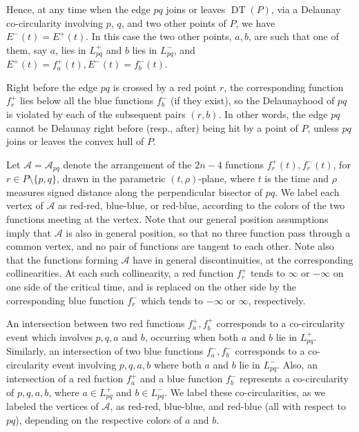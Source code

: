 \documentclass[letter,11pt]{article}
\def\A{\mathcal{A}}
\def \L{{L}}
\def\DT{\mathop{\mathrm{DT}}}
\begin{document}
Hence, at any time when the edge $pq$ joins or leaves $\DT(P)$, via a Delaunay co-circularity involving $p$, $q$, and two other points of $P$, we have $E^-(t)=E^+(t)$. In this case the two other points, $a,b$, are such that one of them, say $a$, lies in $\L_{pq}^+$ and $b$ lies in $\L_{pq}^-$, and $E^+(t)=f_a^+(t), E^-(t)=f_b^-(t)$.


\smallskip
{} 
Right before the edge $pq$ is crossed by a red point $r$, the corresponding function $f_r^+$ lies below all the blue functions $f_b^-$ (if they exist), so the Delaunayhood of $pq$ is violated by each of the subsequent pairs $(r,b)$. 
In other words, the edge $pq$ cannot be Delaunay right before (resp., after) being hit by a point of $P$, unless $pq$ joins or leaves the convex hull of $P$. 

\smallskip

Let $\A=\A_{pq}$ denote the arrangement of the $2n-4$ functions $f_r^+(t),f_r^-(t)$, for $r\in P\setminus\{p,q\}$, drawn in the parametric $(t,\rho)$-plane, where $t$ is the time and $\rho$ measures signed distance along the perpendicular bisector of $pq$. We label each vertex of $\A$ as red-red, blue-blue, or red-blue, according to the colors of the two functions meeting at the vertex. Note that our general position assumptions imply that $\A$ is also in general position, so that no three function pass through a common vertex, and no pair of functions are tangent to each other. Note also that the functions forming $\A$ have in general discontinuities, at the corresponding collinearities. At each such collinearity, a red function $f_r^+$ tends to $\infty$ or $-\infty$ on one side of the critical time, and is replaced on the other side by the corresponding blue function $f_r^-$ which tends to $-\infty$ or $\infty$, respectively.

An intersection between two red functions $f_a^+,f_b^+$ corresponds to a co-circularity event which involves $p,q,a$ and $b$, occurring when both $a$ and $b$ lie in $\L_{pq}^+$.
Similarly, an intersection of two blue functions $f_a^-,f_b^-$ corresponds to a co-circularity event
involving $p,q,a,b$ where both $a$ and $b$ lie in $\L_{pq}^-$. Also, an intersection of a red fuction $f_a^+$ and a blue function $f_b^-$ represents a co-circularity of $p,q,a,b$, where $a\in \L_{pq}^+$ and $b\in \L_{pq}^-$. We label these co-circularities, as we labeled the vertices of $\A$, as red-red, blue-blue, and red-blue (all with respect to $pq$), depending on the respective colors of $a$ and $b$.
\end{document}

